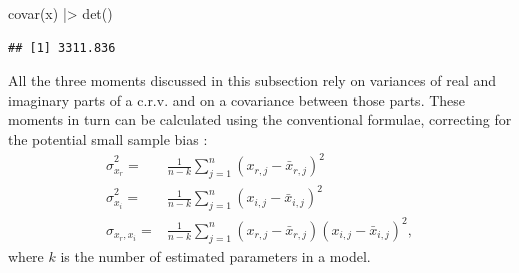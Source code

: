 \documentclass[
]{book}
\newenvironment{Shaded}{\begin{snugshade}}{\end{snugshade}}
\newcommand{\FunctionTok}[1]{\textcolor[rgb]{0.00,0.00,0.00}{#1}}
\newcommand{\NormalTok}[1]{#1}
\newcommand{\SpecialCharTok}[1]{\textcolor[rgb]{0.00,0.00,0.00}{#1}}
\begin{document}
\begin{Shaded}
\begin{Highlighting}[]
\FunctionTok{covar}\NormalTok{(x) }\SpecialCharTok{|\textgreater{}} \FunctionTok{det}\NormalTok{()}
\end{Highlighting}
\end{Shaded}

\begin{verbatim}
## [1] 3311.836
\end{verbatim}

All the three moments discussed in this subsection rely on variances of real and imaginary parts of a c.r.v. and on a covariance between those parts. These moments in turn can be calculated using the conventional formulae, correcting for the potential small sample bias \citep{referenceSBA}:
\begin{equation}
    \begin{aligned}
        \hat{\sigma}_{x_r}^2 = & \frac{1}{n-k} \sum_{j=1}^n (x_{r,j}-\bar{x}_{r,j})^2 \\
        \hat{\sigma}_{x_i}^2 = & \frac{1}{n-k} \sum_{j=1}^n (x_{i,j}-\bar{x}_{i,j})^2 \\
        \hat{\sigma}_{x_r, x_i} = & \frac{1}{n-k} \sum_{j=1}^n (x_{r,j}-\bar{x}_{r,j})(x_{i,j}-\bar{x}_{i,j})^2 ,
    \end{aligned}
    \label{eq:crvMomentSecondSample}
\end{equation}
where \(k\) is the number of estimated parameters in a model.
\end{document}
